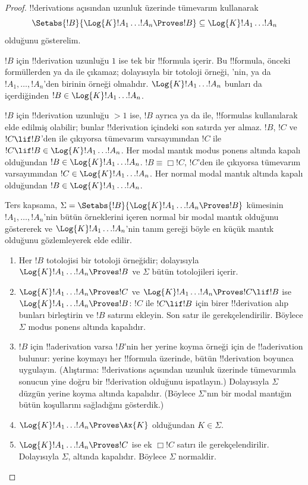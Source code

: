\documentclass[../../../include/open-logic-section]{subfiles}
\begin{document}
\begin{proof}
  !!{derivation}s açısından uzunluk üzerinde tümevarım kullanarak
  \[
  \Setabs{!B}{\Log{K}!A_1\dots !A_n\Proves !B}
  \subseteq\Log{K}!A_1\dots !A_n
  \]
  olduğunu gösterelim.

  $!B$ için !!{derivation} uzunluğu $1$ ise tek bir !!{formula} içerir.
  Bu !!{formula}, önceki formüllerden \MP{} ya da \Nec{} ile çıkamaz;
  dolayısıyla bir totoloji örneği, 'nin,
   ya da $!A_1,\dots,!A_n$'den birinin
  örneği olmalıdır. $\Log{K}!A_1\dots !A_n$ bunları da içerdiğinden
  $!B\in\Log{K}!A_1\dots !A_n$.

  $!B$ için !!{derivation} uzunluğu $>1$ ise, $!B$ ayrıca \MP{} ya da
  \Nec{} ile, !!{formula}s kullanılarak elde edilmiş olabilir; bunlar
  !!{derivation} içindeki son satırda yer almaz. $!B$, $!C$ ve
  $!C\lif !B$'den \MP{} ile çıkıyorsa tümevarım varsayımından $!C$ ile
  $!C\lif !B\in\Log{K}!A_1\dots !A_n$.
  Her modal mantık modus ponens altında kapalı olduğundan
  $!B\in\Log{K}!A_1\dots !A_n$. $!B\equiv\Box !C$, $!C$'den \Nec{} ile
  çıkıyorsa tümevarım varsayımından $!C\in\Log{K}!A_1\dots !A_n$.
  Her normal modal mantık \Nec{} altında kapalı olduğundan
  $!B\in\Log{K}!A_1\dots !A_n$.

  Ters kapsama, $\Sigma=\Setabs{!B}{\Log{K}!A_1\dots !A_n\Proves !B}$
  kümesinin $!A_1,\dots,!A_n$'nin bütün örneklerini içeren normal bir modal
  mantık olduğunu göstererek ve $\Log{K}!A_1\dots !A_n$'nin tanım gereği
  böyle en küçük mantık olduğunu gözlemleyerek elde edilir.
  \begin{enumerate}
    \item Her $!B$ totolojisi bir totoloji örneğidir; dolayısıyla
      $\Log{K}!A_1\dots !A_n\Proves !B$ ve $\Sigma$ bütün totolojileri
      içerir.
    \item $\Log{K}!A_1\dots !A_n\Proves !C$ ve
      $\Log{K}!A_1\dots !A_n\Proves !C\lif !B$ ise
      $\Log{K}!A_1\dots !A_n\Proves !B$: $!C$ ile $!C\lif !B$ için birer
      !!{derivation} alıp bunları birleştirin ve $!B$ satırını ekleyin.
      Son satır \MP{} ile gerekçelendirilir. Böylece $\Sigma$ modus ponens
      altında kapalıdır.
    \item $!B$ için !!a{derivation} varsa $!B$'nin her yerine koyma
      örneği için de !!a{derivation} bulunur: yerine koymayı her !!{formula}
      üzerinde, bütün !!{derivation} boyunca uygulayın. (Alıştırma: !!{derivation}s açısından
      uzunluk üzerinde tümevarımla sonucun yine doğru bir !!{derivation}
      olduğunu ispatlayın.) Dolayısıyla $\Sigma$ düzgün yerine koyma altında
      kapalıdır. (Böylece $\Sigma$'nın bir modal mantığın bütün koşullarını
      sağladığını gösterdik.)
    \item $\Log{K}!A_1\dots !A_n\Proves\Ax{K}$ olduğundan $K\in\Sigma$.
    \item $\Log{K}!A_1\dots !A_n\Proves !C$ ise ek $\Box !C$ satırı
      \Nec{} ile gerekçelendirilir. Dolayısıyla $\Sigma$, \Nec{} altında
      kapalıdır. Böylece $\Sigma$ normaldir.
  \end{enumerate}
\end{proof}
\end{document}
